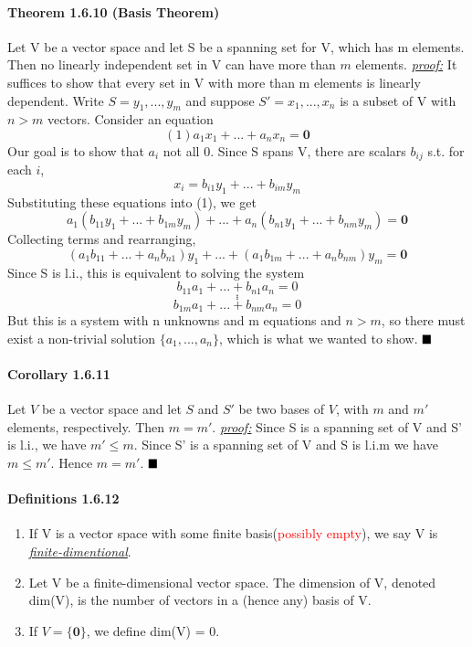 \documentclass[11pt]{article}
\newcommand{\ti}[1]{\textit{#1}}
\newcommand{\tb}[1]{\textbf{#1}}
\newcommand{\under}[1]{\underline{#1}}
\newcommand{\proof}[0]{\textit{\underline{proof:} }}
\newcommand{\qed}[0]{$\hfill\blacksquare$}
\begin{document}
	\paragraph{Theorem 1.6.10 (Basis Theorem)} Let V be a vector space and let S be a spanning set for V, which has m elements. Then no linearly independent set in V can have more than $m$ elements.\newline \newline
	\ti{\under{proof:}} It suffices to show that every set in V with more than m elements is linearly dependent. Write $S = {y_1, ..., y_m}$ and suppose $S' = {x_1, ..., x_n}$ is a subset of V with $n >m$ vectors. Consider an equation
	$$(1)a_1x_1 + ... + a_nx_n = \tb{0}$$
	Our goal is to show that $a_i$ not all 0.
	Since S spans V, there are scalars $b_{ij}$ s.t. for each $i$,
	$$x_i = b_{i1}y_1 + ... +b_{im}y_m$$
	Substituting these equations into (1), we get $$a_1(b_{11}y_1+...+b_{1m}y_m)+...+a_n(b_{n1}y_1+...+b_{nm}y_m)=\tb{0}$$
	Collecting terms and rearranging,
	$$(a_1b_{11}+...+a_nb_{n1})y_1+...+(a_1b_{1m}+...+a_nb_{nm})y_m = \tb{0}$$
	Since S is l.i., this is equivalent to solving the system
	$$b_{11}a_1+...+b_{n1}a_n = 0$$
	$$.$$
	$$.$$
	$$.$$
	$$b_{1m}a_1+...+b_{nm}a_n=0$$
	But this is a system with n unknowns and m equations and $n>m$, so there must exist a non-trivial solution $\{a_1,...,a_n\}$, which is what we wanted to show. \qed
	\paragraph{Corollary 1.6.11} Let $V$ be a vector space and let $S$ and $S'$ be two bases of $V$, with $m$ and $m'$ elements, respectively. Then $m = m'$.\newline \newline
	\proof\newline
	Since S is a spanning set of V and S' is l.i., we have $m'\leq m$. Since S' is a spanning set of V and S is l.i.m we have $m \leq m'$. Hence $m = m'$. \qed
	\paragraph{Definitions 1.6.12}
	\begin{enumerate}
		\item If V is a vector space with some finite basis(\textcolor{red}{possibly empty}), we say V is \under{\it{finite-dimentional}}.
		\item Let V be a finite-dimensional vector space. The dimension of V, denoted dim(V), is the number of vectors in a (hence any) basis of V.
		\item If $V = \{\tb{0}\}$, we define dim(V) = 0.
	\end{enumerate}
\end{document}
